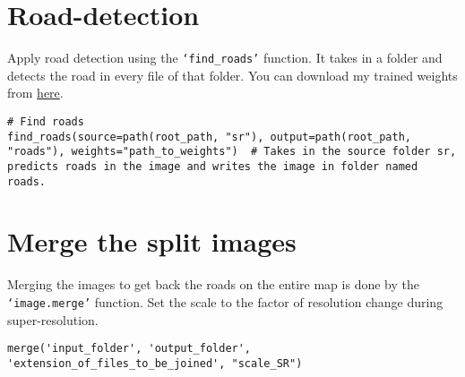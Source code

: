 \section{Road-detection}
Apply road detection using the \texttt{`find\_roads'} function. It takes in a folder and detects the road in every file of that folder. You can download my trained weights from \href{https://nautatva.github.io/btp/weight/road}{here}.

\begin{verbatim}
# Find roads
find_roads(source=path(root_path, "sr"), output=path(root_path, "roads"), weights="path_to_weights")  # Takes in the source folder sr, predicts roads in the image and writes the image in folder named roads.
\end{verbatim}

\section{Merge the split images}
Merging the images to get back the roads on the entire map is done by the \texttt{`image.merge'} function.
Set the scale to the factor of resolution change during super-resolution.

\begin{verbatim}
merge('input_folder', 'output_folder', 'extension_of_files_to_be_joined', "scale_SR")
\end{verbatim}